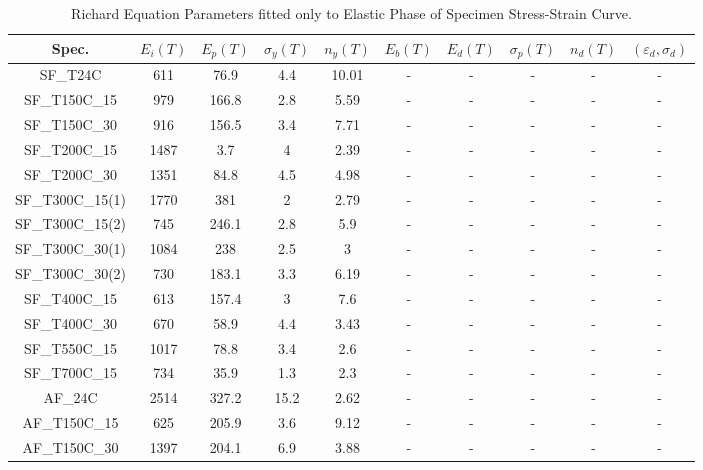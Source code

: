 \documentclass[review]{elsarticle}
\begin{document}
\begin{landscape}


\begin{table}[htbp]
	\centering
	\caption{Richard Equation Parameters fitted only to Elastic Phase of Specimen Stress-Strain Curve.}
	\begin{tabular}{cccccccccc}
		\toprule
		Spec. &   $E_i(T)$    &   $E_p(T)$    &  $\sigma_y(T)$     &   $n_y(T)$     &    $E_b(T)$   &    $E_d(T)$   &   $\sigma_p(T)$    &   $n_d(T)$    &  $(\varepsilon_d,\sigma_d)$\\
		\midrule
		SF\_T24C & 611   & 76.9  & 4.4   & 10.01 & -     & -     & -     & -     & - \\
		SF\_T150C\_15 & 979   & 166.8 & 2.8   & 5.59  & -     & -     & -     & -     & - \\
		SF\_T150C\_30 & 916   & 156.5 & 3.4   & 7.71  & -     & -     & -     & -     & - \\
		SF\_T200C\_15 & 1487  & 3.7   & 4     & 2.39  & -     & -     & -     & -     & - \\
		SF\_T200C\_30 & 1351  & 84.8  & 4.5   & 4.98  & -     & -     & -     & -     & - \\
		SF\_T300C\_15(1) & 1770  & 381   & 2     & 2.79  & -     & -     & -     & -     & - \\
		SF\_T300C\_15(2) & 745   & 246.1 & 2.8   & 5.9   & -     & -     & -     & -     & - \\
		SF\_T300C\_30(1) & 1084  & 238   & 2.5   & 3     & -     & -     & -     & -     & - \\
		SF\_T300C\_30(2) & 730   & 183.1 & 3.3   & 6.19  & -     & -     & -     & -     & - \\
		SF\_T400C\_15 & 613   & 157.4 & 3     & 7.6   & -     & -     & -     & -     & - \\
		SF\_T400C\_30 & 670   & 58.9  & 4.4   & 3.43  & -     & -     & -     & -     & - \\
		SF\_T550C\_15 & 1017  & 78.8  & 3.4   & 2.6   & -     & -     & -     & -     & - \\
		SF\_T700C\_15 & 734   & 35.9  & 1.3   & 2.3   & -     & -     & -     & -     & - \\
		AF\_24C & 2514  & 327.2 & 15.2  & 2.62  & -     & -     & -     & -     & - \\
		AF\_T150C\_15 & 625   & 205.9 & 3.6   & 9.12  & -     & -     & -     & -     & - \\
		AF\_T150C\_30 & 1397  & 204.1 & 6.9   & 3.88  & -     & -     & -     & -     & - \\

\end{tabular}
\end{table}
\end{landscape}
\end{document}
